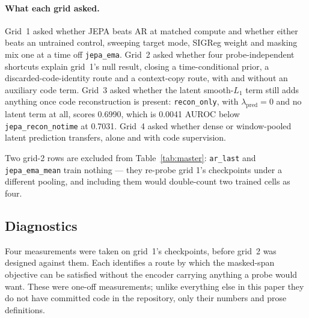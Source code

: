 \documentclass[11pt,a4paper]{article}
\newcommand{\code}[1]{\texttt{\small #1}}
\begin{document}
\paragraph{What each grid asked.}
Grid~1 asked whether JEPA beats AR at matched compute and whether either beats
an untrained control, sweeping target mode, SIGReg weight and masking mix one at
a time off \code{jepa\_ema}. Grid~2 asked whether four probe-independent
shortcuts explain grid~1's null result, closing a time-conditional prior, a
discarded-code-identity route and a context-copy route, with and without an
auxiliary code term. Grid~3 asked whether the latent smooth-$L_1$ term still
adds anything once code reconstruction is present: \code{recon\_only}, with
$\lambda_{\mathrm{pred}} = 0$ and no latent term at all, scores 0.6990, which is
0.0041 AUROC below \code{jepa\_recon\_notime} at 0.7031. Grid~4 asked whether
dense or window-pooled latent prediction transfers, alone and with code
supervision.

Two grid-2 rows are excluded from Table~\ref{tab:master}: \code{ar\_last} and
\code{jepa\_ema\_mean} train nothing --- they re-probe grid 1's checkpoints
under a different pooling, and including them would double-count two trained
cells as four.

\subsection{Diagnostics}
\label{sec:diagnostics}

Four measurements were taken on grid~1's checkpoints, before grid~2 was
designed against them. Each identifies a route by which the masked-span
objective can be satisfied without the encoder carrying anything a probe would
want. These were one-off measurements; unlike everything else in this paper
they do not have committed code in the repository, only their numbers and
prose definitions.
\end{document}
